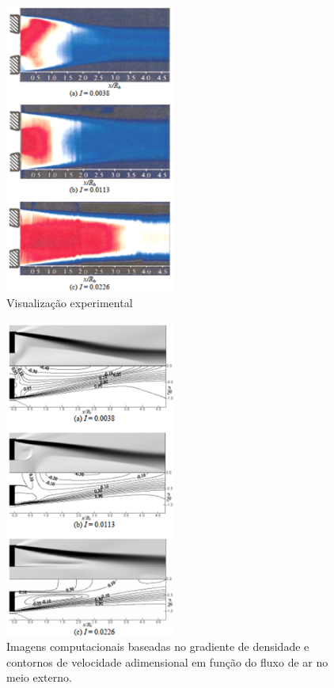 \begin{figure}[!ht]
	\centering
	\includegraphics[width=0.5\textwidth]{foto07-bourdon2003.png}
	\caption[Visualização experimental]{Visualização experimental~\cite{Bourdon2003Feb}}
	\label{fig7:bourdon2003}
\end{figure}

\begin{figure}[!ht]
	\centering
	\includegraphics[width=0.5\textwidth]{foto08-base-lee&kim.png}
	\caption[Imagens computacionais baseadas no gradiente de densidade e contornos de velocidade adimensional em função do fluxo de ar no meio externo.]{Imagens computacionais baseadas no gradiente de densidade e contornos de velocidade adimensional em função do fluxo de ar no meio externo. \cite{Lee2006Sep}}
	\label{fig8:lee2006}
\end{figure}

